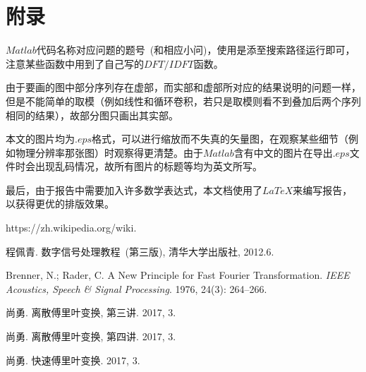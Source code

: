 \documentclass[a4paper,11pt,onecolumn,twoside]{article}
\begin{document}
\section{附录}
$Matlab$代码名称对应问题的题号~(和相应小问)，使用是添至搜索路径运行即可，注意某些函数中用到了自己写的$DFT/IDFT$函数。

由于要画的图中部分序列存在虚部，而实部和虚部所对应的结果说明的问题一样，但是不能简单的取模（例如线性和循环卷积，若只是取模则看不到叠加后两个序列相同的结果），故部分图只画出其实部。

本文的图片均为$.eps$格式，可以进行缩放而不失真的矢量图，在观察某些细节（例如物理分辨率那张图）时观察得更清楚。由于$Matlab$含有中文的图片在导出$.eps$文件时会出现乱码情况，故所有图片的标题等均为英文所写。

最后，由于报告中需要加入许多数学表达式，本文档使用了$LaTeX$来编写报告，以获得更优的排版效果。

\small
\begin{thebibliography}{99}
\setlength{\parskip}{0pt}  %

https://zh.wikipedia.org/wiki.

程佩青. 数字信号处理教程~(第三版), 清华大学出版社, 2012.6.

Brenner, N.; Rader, C. A New Principle for Fast Fourier Transformation. \emph{IEEE Acoustics, Speech \& Signal Processing}. 1976, 24(3): 264–266.

尚勇. 离散傅里叶变换, 第三讲. 2017, 3.

尚勇. 离散傅里叶变换, 第四讲. 2017, 3.

尚勇. 快速傅里叶变换. 2017, 3.

\end{thebibliography}

\clearpage
\end{document}
